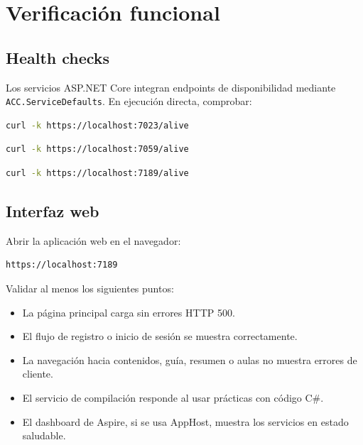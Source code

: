 \documentclass[12pt,letterpaper]{article}
\begin{document}
\section{Verificaci\'on funcional}

\subsection{Health checks}

Los servicios ASP.NET Core integran endpoints de disponibilidad mediante \texttt{ACC.ServiceDefaults}. En ejecuci\'on directa, comprobar:

\begin{lstlisting}[language=bash,caption={Verificaci\'on del servicio de compilaci\'on.}]
curl -k https://localhost:7023/alive
\end{lstlisting}

\begin{lstlisting}[language=bash,caption={Verificaci\'on de la API acad\'emica.}]
curl -k https://localhost:7059/alive
\end{lstlisting}

\begin{lstlisting}[language=bash,caption={Verificaci\'on de la aplicaci\'on web.}]
curl -k https://localhost:7189/alive
\end{lstlisting}

\subsection{Interfaz web}

Abrir la aplicaci\'on web en el navegador:

\begin{lstlisting}[caption={URL de la WebApp en ejecuci\'on directa.}]
https://localhost:7189
\end{lstlisting}

Validar al menos los siguientes puntos:

\begin{itemize}[noitemsep]
    \item La p\'agina principal carga sin errores HTTP 500.
    \item El flujo de registro o inicio de sesi\'on se muestra correctamente.
    \item La navegaci\'on hacia contenidos, gu\'ia, resumen o aulas no muestra errores de cliente.
    \item El servicio de compilaci\'on responde al usar pr\'acticas con c\'odigo C\#.
    \item El dashboard de Aspire, si se usa AppHost, muestra los servicios en estado saludable.
\end{itemize}
\end{document}
